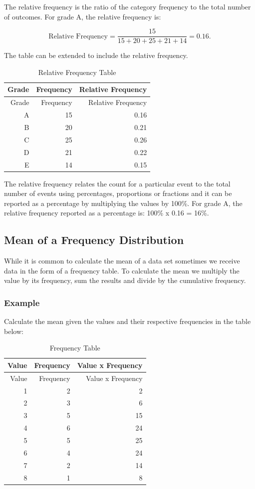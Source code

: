 \documentclass[
]{book}
\begin{document}
The relative frequency is the ratio of the category frequency to the total number of outcomes. For grade A, the relative frequency is:

\[ \textrm{Relative Frequency}=\frac{15}{15+20+25+21+14}=0.16. \]

The table can be extended to include the relative frequency.

\begin{longtable}[]{@{}rrr@{}}
\caption{\label{tab:table7} Relative Frequency Table}\tabularnewline
\toprule
Grade & Frequency & Relative Frequency \\
\midrule
\endfirsthead
\toprule
Grade & Frequency & Relative Frequency \\
\midrule
\endhead
A & 15 & 0.16 \\
B & 20 & 0.21 \\
C & 25 & 0.26 \\
D & 21 & 0.22 \\
E & 14 & 0.15 \\
\bottomrule
\end{longtable}

The relative frequency relates the count for a particular event to the total number of events using percentages, proportions or fractions and it can be reported as a percentage by multiplying the values by 100\%. For grade A, the relative frequency reported as a percentage is: 100\% x 0.16 = 16\%.

\hypertarget{mean-of-a-frequency-distribution}{%
\subsection{Mean of a Frequency Distribution}\label{mean-of-a-frequency-distribution}}

While it is common to calculate the mean of a data set sometimes we receive data in the form of a frequency table. To calculate the mean we multiply the value by its frequency, sum the results and divide by the cumulative frequency.

\hypertarget{example-6}{%
\subsubsection{Example}\label{example-6}}

Calculate the mean given the values and their respective frequencies in the table below:

\begin{longtable}[]{@{}rrr@{}}
\caption{\label{tab:table07} Frequency Table}\tabularnewline
\toprule
Value & Frequency & Value x Frequency \\
\midrule
\endfirsthead
\toprule
Value & Frequency & Value x Frequency \\
\midrule
\endhead
1 & 2 & 2 \\
2 & 3 & 6 \\
3 & 5 & 15 \\
4 & 6 & 24 \\
5 & 5 & 25 \\
6 & 4 & 24 \\
7 & 2 & 14 \\
8 & 1 & 8 \\
\bottomrule
\end{longtable}
\end{document}
